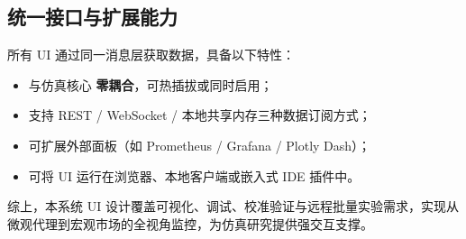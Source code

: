 \documentclass{mancls}
\begin{document}
\subsection{统一接口与扩展能力}

所有 UI 通过同一消息层获取数据，具备以下特性：

\begin{itemize}
  \item 与仿真核心 \textbf{零耦合}，可热插拔或同时启用；
  \item 支持 REST / WebSocket / 本地共享内存三种数据订阅方式；
  \item 可扩展外部面板（如 Prometheus / Grafana / Plotly Dash）；
  \item 可将 UI 运行在浏览器、本地客户端或嵌入式 IDE 插件中。
\end{itemize}

\noindent 综上，本系统 UI 设计覆盖可视化、调试、校准验证与远程批量实验需求，实现从微观代理到宏观市场的全视角监控，为仿真研究提供强交互支撑。
\end{document}

